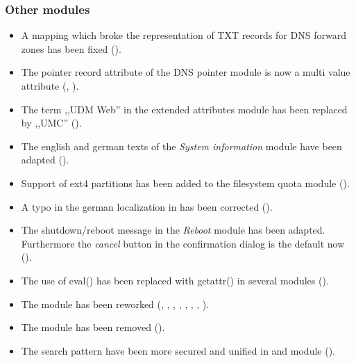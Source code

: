 \subsubsection{Other modules}
\begin{itemize}
\item A mapping which broke the representation of TXT records for DNS forward
  zones has been fixed ().
\item The pointer record attribute of the DNS pointer module is now a multi
value attribute (, ).
\item The term ,,UDM Web'' in the extended attributes module has been replaced
  by ,,UMC'' ().
\item The english and german texts of the \emph{System information}
  module have been adapted ().
\item Support of ext4 partitions has been added to the filesystem quota module
  ().
\item A typo in the german localization in
   has been corrected
  ().
\item The shutdown/reboot message in the \emph{Reboot} module has been
  adapted. Furthermore the \emph{cancel} button in the confirmation
  dialog is the default now ().
\item The use of eval() has been replaced with getattr() in several  modules ().
\item The  module has been reworked (, , , , , , , ).
\item The  module has been removed ().
\item The search pattern have been more secured and unified in  and  module ().
\end{itemize}




